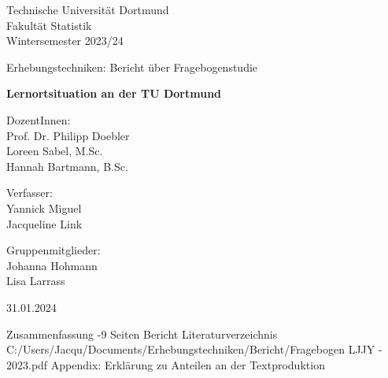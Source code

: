 \documentclass[a4paper]{article}
\begin{document}
\thispagestyle{empty}

\begin{center}
	\Large
	Technische Universität Dortmund\\
	Fakultät Statistik\\
	Wintersemester 2023/24\\
	
	\vspace{6em}
	
	Erhebungstechniken: Bericht über Fragebogenstudie
	
	\Huge
	\textbf{Lernortsituation an der TU Dortmund}
	
	\Large
	\vspace{4em}
	DozentInnen:	\\Prof. Dr. Philipp Doebler \\Loreen Sabel, M.Sc.\\Hannah Bartmann, B.Sc.


	\vspace{6em}
	Verfasser: \\
	Yannick Miguel \\Jacqueline Link
	
	\vspace{6em}
	Gruppenmitglieder:\\
	Johanna Hohmann\\
	Lisa Larrass
	
    \vspace{6em}
    
	31.01.2024
\end{center}

\newpage \null\thispagestyle{empty}\newpage
\tableofcontents
\newpage\null\thispagestyle{empty}\newpage
Zusammenfassung
\newpage\null\thispagestyle{empty}-9 Seiten Bericht
\newpage Literaturverzeichnis
\newpage 
 {C:/Users/Jacqu/Documents/Erhebungstechniken/Bericht/Fragebogen LJJY - 2023.pdf}
\newpage Appendix: Erklärung zu Anteilen an der Textproduktion
\end{document}
